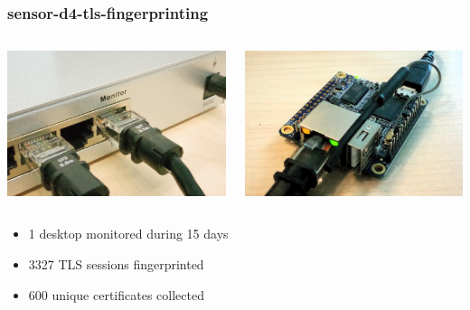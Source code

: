 \documentclass{beamer}
\begin{document}
\begin{frame}
        \frametitle{sensor-d4-tls-fingerprinting}
        \begin{columns}
            \begin{column}{0.5\textwidth}
              \begin{center}
                \includegraphics[scale=0.2]{../../informal-preso/0-intro-banana/monitor.png}
              \end{center}
            \end{column}
            \begin{column}{0.5\textwidth} 
              \begin{center}
                \includegraphics[scale=0.2]{../../informal-preso/0-intro-banana/orangepi.png}
              \end{center}
            \end{column}
          \end{columns}
          \hspace{20pt}
          \begin{itemize}
            \item 1 desktop monitored during 15 days
            \item 3327 TLS sessions fingerprinted
            \item 600 unique certificates collected
          \end{itemize}
\end{frame}
\end{document}

